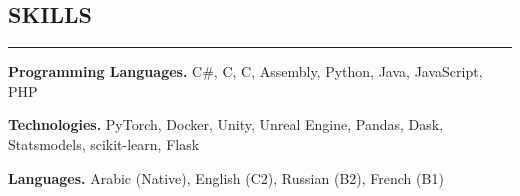 \documentclass[9.5pt,letterpaper]{article}
\makeatletter
\newenvironment{indentsection}[1]%
{\begin{list}{}%
		{\setlength{\leftmargin}{#1}}%
		\item[]%
	}
	{\end{list}}
\newcommand{\headerrow}[2]
{\begin{tabular*}{\linewidth}{l@{\extracolsep{\fill}}r}
		#1 &
		#2 \\
\end{tabular*}}
\newcommand{\CPP}
{C\nolinebreak[4]\hspace{-.05em}\raisebox{.22ex}{\footnotesize\bf ++}}
\newcommand{\resumesection}[1]
{\vspace{-2em}
\subsection*{\MakeUppercase{#1}}
\vspace{-0.2em}
\hrule
\vspace{0.2em}}
\makeatother
\begin{document}
\begin{indentsection}{0pt}




 
        




				
	
	\resumesection{Skills}
	\begin{indentsection}{0pt}
		\fontsize{9.5}{11}\selectfont
		
			
		{\textbf{Programming Languages.} C\#, \CPP , C, Assembly, Python, Java, JavaScript, PHP}
		
		\vspace{-0.2em}
		
		\textbf{Technologies.} PyTorch, Docker, Unity, Unreal Engine, Pandas,  Dask, Statsmodels, scikit-learn,  Flask
		
			\textbf{Languages.} Arabic (Native), English (C2), Russian (B2), French (B1)
		
		\vspace{1em}
		
		
                      \end{indentsection}


		
       \end{indentsection}
	
\end{document}
